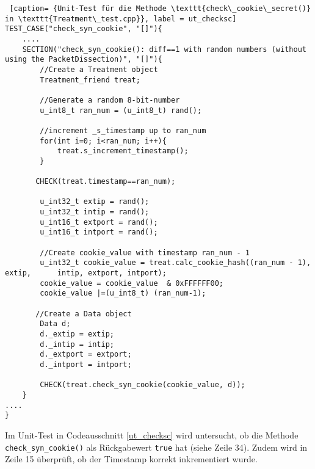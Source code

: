 \documentclass[../review_3.tex]{subfiles}
\begin{document}
\begin{lstlisting} [caption= {Unit-Test für die Methode \texttt{check\_cookie\_secret()} in \texttt{Treatment\_test.cpp}}, label = ut_checksc]
TEST_CASE("check_syn_cookie", "[]"){
    ....
    SECTION("check_syn_cookie(): diff==1 with random numbers (without using the PacketDissection)", "[]"){
        //Create a Treatment object
        Treatment_friend treat;
            
        //Generate a random 8-bit-number
        u_int8_t ran_num = (u_int8_t) rand();
            
        //increment _s_timestamp up to ran_num
        for(int i=0; i<ran_num; i++){
            treat.s_increment_timestamp();
        }
            
       CHECK(treat.timestamp==ran_num);
            
        u_int32_t extip = rand();
        u_int32_t intip = rand();
        u_int16_t extport = rand();
        u_int16_t intport = rand();
            
        //Create cookie_value with timestamp ran_num - 1
        u_int32_t cookie_value = treat.calc_cookie_hash((ran_num - 1), extip,      intip, extport, intport);
        cookie_value = cookie_value  & 0xFFFFFF00;
        cookie_value |=(u_int8_t) (ran_num-1);
            
       //Create a Data object
        Data d;
        d._extip = extip;
        d._intip = intip;
        d._extport = extport;
        d._intport = intport;
            
        CHECK(treat.check_syn_cookie(cookie_value, d));
    }
....
} \end{lstlisting}
Im Unit-Test in Codeausschnitt \ref{ut_checksc} wird untersucht, ob die Methode \texttt{check\_syn\_cookie()} als Rückgabewert \texttt{true} hat (siehe Zeile 34). Zudem wird in Zeile 15 überprüft, ob der Timestamp korrekt inkrementiert wurde.
\end{document}
